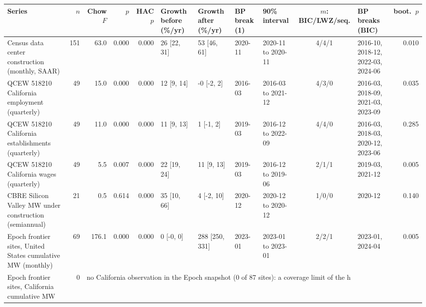 \begin{tabular}{p{5.6cm}rrrrllllcp{3.6cm}r}
\toprule
Series & $n$ & Chow $F$ & $p$ & HAC $p$ & Growth before (\%/yr) & Growth after (\%/yr) & BP break (1) & 90\% interval & $m$: BIC/LWZ/seq. & BP breaks (BIC) & boot.\ $p$ \\
\midrule
Census data center construction (monthly, SAAR) & 151 & 63.0 & 0.000 & 0.000 & 26 [22, 31] & 53 [46, 61] & 2020-11 & 2020-11 to 2020-11 & 4/4/1 & 2016-10, 2018-12, 2022-03, 2024-06 & 0.010 \\
QCEW 518210 California employment (quarterly) & 49 & 15.0 & 0.000 & 0.000 & 12 [9, 14] & -0 [-2, 2] & 2016-03 & 2016-03 to 2021-12 & 4/3/0 & 2016-03, 2018-09, 2021-03, 2023-09 & 0.035 \\
QCEW 518210 California establishments (quarterly) & 49 & 11.0 & 0.000 & 0.000 & 11 [9, 13] & 1 [-1, 2] & 2019-03 & 2016-12 to 2022-09 & 4/4/0 & 2016-03, 2018-03, 2020-12, 2023-06 & 0.285 \\
QCEW 518210 California wages (quarterly) & 49 & 5.5 & 0.007 & 0.000 & 22 [19, 24] & 11 [9, 13] & 2019-03 & 2016-12 to 2019-06 & 2/1/1 & 2019-03, 2021-12 & 0.005 \\
CBRE Silicon Valley MW under construction (semiannual) & 21 & 0.5 & 0.614 & 0.000 & 35 [10, 66] & 4 [-2, 10] & 2020-12 & 2020-12 to 2020-12 & 1/0/0 & 2020-12 & 0.140 \\
Epoch frontier sites, United States cumulative MW (monthly) & 69 & 176.1 & 0.000 & 0.000 & 0 [-0, 0] & 288 [250, 331] & 2023-01 & 2023-01 to 2023-01 & 2/2/1 & 2023-01, 2024-04 & 0.005 \\
Epoch frontier sites, California cumulative MW & 0 & \multicolumn{10}{l}{no California observation in the Epoch snapshot (0 of 87 sites): a coverage limit of the h} \\
\bottomrule
\end{tabular}